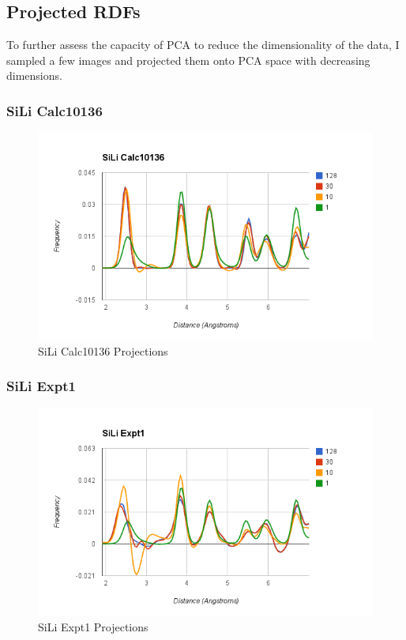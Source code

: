 \documentclass[12pt,letterpaper]{article}
\begin{document}
\subsection{Projected RDFs}
To further assess the capacity of PCA to reduce the dimensionality of the data,
I sampled a few images and projected them onto PCA space with decreasing
dimensions.

\subsubsection{SiLi Calc10136}
\begin{figure}[ht]
  \begin{center}
    \includegraphics[scale=0.7]{figs/pca_proj_sili_calc10136.png}
    \caption{SiLi Calc10136 Projections}
  \end{center}
\end{figure}
\clearpage

\subsubsection{SiLi Expt1}
\begin{figure}[ht]
  \begin{center}
    \includegraphics[scale=0.7]{figs/pca_proj_sili_expt1.png}
    \caption{SiLi Expt1 Projections}
  \end{center}
\end{figure}
\clearpage
\end{document}
